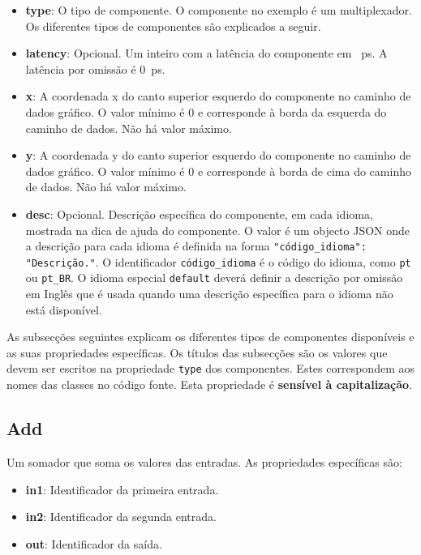 \documentclass[11pt,a4paper,twoside,titlepage]{report}
\begin{document}
\begin{itemize}
	\item \textbf{type}: O tipo de componente. O componente no exemplo é um
		multiplexador. Os diferentes tipos de componentes são explicados a seguir.
	\item \textbf{latency}: Opcional. Um inteiro com a latência do componente em
		\SI{}{\pico\second}. A latência por omissão é \SI{0}{\pico\second}.
	\item \textbf{x}: A coordenada x do canto superior esquerdo do componente no
		caminho de dados gráfico. O valor mínimo é 0 e corresponde à borda da
		esquerda do caminho de dados. Não há valor máximo.
	\item \textbf{y}: A coordenada y do canto superior esquerdo do componente no
		caminho de dados gráfico. O valor mínimo é 0 e corresponde à borda de
		cima do caminho de dados. Não há valor máximo.
	\item \textbf{desc}: Opcional. Descrição específica do componente, em cada
		idioma, mostrada na dica de ajuda do componente.
		O valor é um objecto JSON onde a descrição para cada idioma é definida na
		forma \verb+"código_idioma": "Descrição."+. O identificador
		\verb+código_idioma+ é o código do idioma, como \verb+pt+ ou \verb+pt_BR+.
		O idioma especial \verb+default+ deverá definir a descrição por omissão em
		Inglês que é usada quando uma descrição específica para o idioma não está
		disponível.
\end{itemize}

As subsecções seguintes explicam os diferentes tipos de componentes disponíveis
e as suas propriedades específicas.
Os títulos das subsecções são os valores que devem ser escritos na propriedade
\verb+type+ dos componentes. Estes correspondem aos nomes das classes no
código fonte. Esta propriedade é \textbf{sensível à capitalização}.

\subsection{Add}

Um somador que soma os valores das entradas. As propriedades específicas são:
\begin{itemize}
	\item \textbf{in1}: Identificador da primeira entrada.
	\item \textbf{in2}: Identificador da segunda entrada.
	\item \textbf{out}: Identificador da saída.
\end{itemize}
\end{document}

